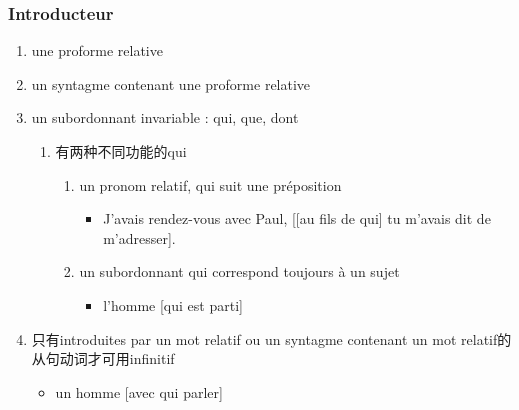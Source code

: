 \documentclass[UTF8]{report}
\begin{document}
\subsubsection{Introducteur}

\begin{enumerate}
    \item une proforme relative
    \item un syntagme contenant une proforme relative
    \item un subordonnant invariable : qui, que, dont
    \begin{enumerate}
        \item 有两种不同功能的qui
        \begin{enumerate}
            \item un pronom relatif, qui suit une préposition
            \begin{itemize}
                \item J’avais rendez-vous avec Paul, [[au fils de qui] tu m’avais dit de m’adresser].
            \end{itemize}
            \item un subordonnant qui correspond toujours à un sujet
            \begin{itemize}
                \item l’homme [qui est parti]
            \end{itemize}
        \end{enumerate}
    \end{enumerate}
    \item 只有introduites par un mot relatif ou un syntagme contenant un mot relatif的从句动词才可用infinitif
    \begin{itemize}
        \item un homme [avec qui parler]
    \end{itemize}
\end{enumerate}
\end{document}
